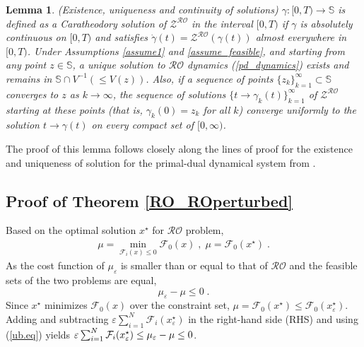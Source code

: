 \documentclass[journal,twoside,web]{ieeecolor}
\newcommand{\rev}[1]{#1}
\newtheorem{lemma}{Lemma}
\begin{document}
\begin{lemma} \label{uniq_exis}
(Existence, uniqueness and continuity of solutions)
$\gamma:[0,T) \rightarrow {\mathbb S}$ is defined as a Caratheodory solution of $\mathcal{Z}^{\mathcal{RO}}$ in the interval $[0,T)$ if $\gamma$ is absolutely continuous on $[0,T)$ and satisfies $\dot \gamma(t)=\mathcal{Z}^{\mathcal{RO}} (\gamma(t))$ almost everywhere in $[0,T)$.
Under Assumptions \ref{assume1} and \ref{assume_feasible}, and starting from any point $z\in \mathbb S$, a unique solution to $\mathcal{RO}$ dynamics (\ref{pd_dynamics}) exists and remains in $\mathbb S \cap V^{-1}(\leq V(z))$. Also, if a sequence of points $\{z_k\}_{k=1}^\infty \subset {\mathbb S}$ converges to $z$ as $k \rightarrow \infty$, the sequence of solutions $\{t \rightarrow \gamma_k(t)\}_{k=1}^\infty$ of $\mathcal{Z}^{\mathcal{RO}}$ starting at these points (that is, $\gamma_k(0)=z_k$ for all $k$) converge uniformly to the solution $t \rightarrow \gamma(t)$ on every compact set of $[0,\infty)$.
\end{lemma}
The proof of this lemma follows closely along the lines of proof for the existence and uniqueness of solution for the primal-dual dynamical system from \cite[Lemma~4.3]{cherukuri2016}.

\subsection*{Proof of Theorem \ref{RO_ROperturbed}}

Based on the optimal solution $x^\star$ for $\mathcal{RO}$ problem,
\begin{align*}
\mu=\min_{\mathcal{F}_i(x)\leq  0} \mathcal{F}_0(x)\;,\; \mu=\rev{\mathcal{F}_0(x^\star)}\;.
\end{align*}
As the cost function of $\mu_\varepsilon$ is smaller than or equal to that of $\mathcal{RO}$ and the feasible sets of the two problems are equal,
\begin{equation}\label{ub.eq}
 \mu_\varepsilon-\mu\leq 0\;.
\end{equation}
Since $x^\star$ minimizes $\mathcal{F}_0(x)$ over the constraint set, $\mu=\mathcal{F}_0(x^\star)\leq \mathcal{F}_0(x_\varepsilon^\star)$.
Adding and subtracting $\varepsilon\sum_{i=1}^{\rev{N}}\mathcal{F}_i(x^\star_\varepsilon)$
in the right-hand side (RHS) and using (\ref{ub.eq}) yields $\varepsilon \sum_{i=1}^N{\cal F}_{i}(x_\varepsilon^\star)\leq
\mu_\varepsilon-\mu\leq 0$\;.
\end{document}
